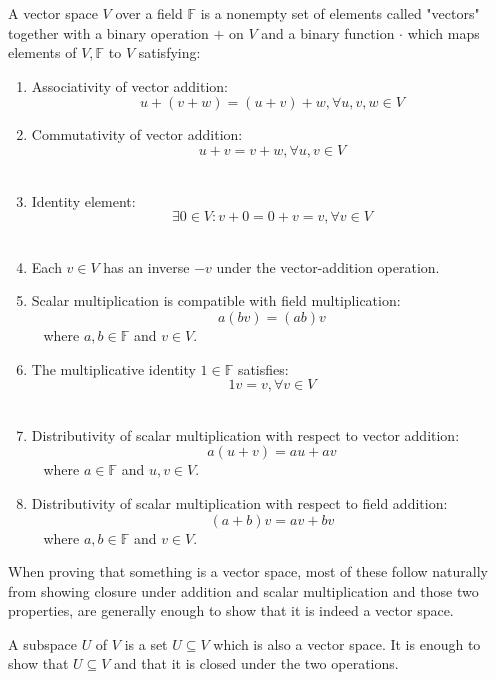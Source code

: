 \begin{defn}
    \label{defn:vector_space}
    A vector space $V$ over a field $\mathbb F$ is a nonempty 
    set of elements called "vectors" together with 
    a binary operation $+$ on $V$ and a binary function 
    $\cdot$ which maps elements of $V, \mathbb F$ to $V$ 
    satisfying: 

    \begin{enumerate}
        \item Associativity of vector addition: 
            $$ 
                u + (v+w) = (u+v)+w, \forall u,v,w \in V
            $$
        \item Commutativity of vector addition: 
            $$ 
                u + v = v + w, \forall u,v \in V
            $$ 
        \item Identity element: 
            $$ 
                \exists 0 \in V : v + 0 = 0 + v = v, \forall v \in V
            $$ 
        \item Each $v \in V$ has an inverse $-v$ under the 
            vector-addition operation.
        \item Scalar multiplication is compatible with field 
            multiplication: 
            $$ 
                a(bv) = (ab)v
            $$ 
            where $a,b \in \mathbb F$ and $v \in V$. 
        \item The multiplicative identity $1 \in \mathbb F$ 
            satisfies: 
            $$ 
                1v = v, \forall v \in V
            $$ 
        \item Distributivity of scalar multiplication with respect 
            to vector addition: 
            $$ 
                a(u+v) = au + av
            $$ 
            where $a \in \mathbb F$ and $u,v \in V$. 
        \item Distributivity of scalar multiplication with 
            respect to field addition: 
            $$ 
                (a+b)v = av + bv
            $$ 
            where $a,b \in \mathbb F$ and $v \in V$. 
    \end{enumerate}

    When proving that something is a vector space, most 
    of these follow naturally from showing closure under 
    addition and scalar multiplication and those two properties, 
    are generally enough to show that it is indeed a vector space. 

    A subspace $U$ of $V$ is a set $U \subseteq V$ which is also 
    a vector space. It is enough to show that $U \subseteq V$ and 
    that it is closed under the two operations. 
\end{defn}

